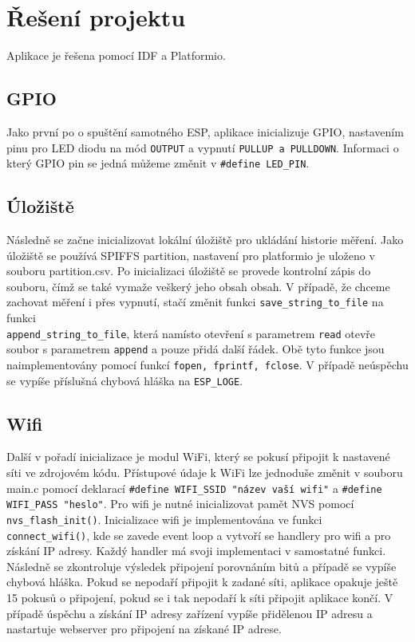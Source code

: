 \documentclass[a4paper, 11pt]{article}
\begin{document}
	\section{Řešení projektu}
 Aplikace je řešena pomocí IDF a Platformio. 
 \subsection{GPIO}
 Jako první po o spuštění samotného ESP, aplikace inicializuje GPIO, nastavením pinu pro LED diodu na mód \texttt{OUTPUT} a vypnutí \texttt{PULLUP a PULLDOWN}. Informaci o který GPIO pin se jedná můžeme změnit v \texttt{\#define LED\_PIN}.
 
 \subsection{Úložiště}
 Následně se začne inicializovat lokální úložiště pro ukládání historie měření. Jako úložiště se používá SPIFFS partition, nastavení pro platformio je uloženo v souboru partition.csv. Po inicializaci úložiště se provede kontrolní zápis do souboru, čímž se také vymaže veškerý jeho obsah obsah. V případě, že chceme zachovat měření i přes vypnutí, stačí změnit funkci \texttt{save\_string\_to\_file} na funkci \\ \texttt{append\_string\_to\_file}, která namísto otevření s parametrem \texttt{read} otevře soubor s parametrem \texttt{append} a pouze přidá další řádek. Obě tyto funkce jsou naimplementovány pomocí funkcí \texttt{fopen, fprintf, fclose}. V případě neúspěchu se vypíše příslušná chybová hláška na \texttt{ESP\_LOGE}.
 
 \subsection{Wifi}
 Další v pořadí inicializace je modul WiFi, který se pokusí připojit k nastavené síti ve zdrojovém kódu. Přístupové údaje k WiFi lze jednoduše změnit v souboru main.c pomocí deklarací \texttt{\#define WIFI\_SSID "název vaší wifi"} a \texttt{\#define WIFI\_PASS "heslo"}. Pro wifi je nutné inicializovat pamět NVS pomocí \texttt{nvs\_flash\_init()}. Inicializace wifi je implementována ve funkci \texttt{connect\_wifi()}, kde se zavede event loop a vytvoří se handlery pro wifi a pro získání IP adresy. Každý handler má svoji implementaci v samostatné funkci. Následně se zkontroluje výsledek připojení porovnáním bitů a případě se vypíše chybová hláška. Pokud se nepodaří připojit k zadané síti, aplikace opakuje ještě 15 pokusů o připojení, pokud se i tak nepodaří k síti připojit aplikace končí. V případě úspěchu a získání IP adresy zařízení vypíše přidělenou IP adresu a nastartuje webserver pro připojení na získané IP adrese. 
\end{document}
